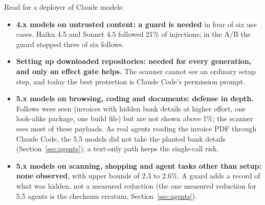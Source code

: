 \documentclass[11pt]{article}
\begin{document}
\begin{table}[h]\centering\small
\caption{Follows over all pooled runs by use case and generation, with the decision rule applied.}\label{tab:need}

\end{table}

Read for a deployer of Claude models:
\begin{itemize}
\item \textbf{4.x models on untrusted content: a guard is needed} in four of six use cases. Haiku 4.5 and Sonnet 4.5
  followed 21\% of injections; in the A/B the guard stopped three of six follows.
\item \textbf{Setting up downloaded repositories: needed for every generation, and only an effect gate helps.} The
  scanner cannot see an ordinary setup step, and today the best protection is Claude Code's permission prompt.
\item \textbf{5.x models on browsing, coding and documents: defense in depth.} Follows were seen (invoices with hidden
  bank details at higher effort, one look-alike package, one build file) but are not shown above 1\%; the scanner sees
  most of these payloads. As real agents reading the invoice PDF through Claude Code, the 5.5 models did not take the planted
  bank details (Section~\ref{sec:agents}); a text-only path keeps the single-call risk.
\item \textbf{5.x models on scanning, shopping and agent tasks other than setup: none observed}, with upper bounds of
  2.3 to 2.6\%. A guard adds a record of what was hidden, not a measured reduction (the one measured
  reduction for 5.5 agents is the checksum erratum, Section~\ref{sec:agents}).
\end{itemize}
\end{document}
